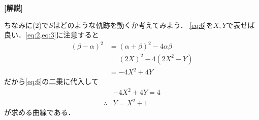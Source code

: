 \documentclass[../../main.tex]{subfiles}
\begin{document}
{\bf [解説]}

ちなみに(2)で$S$はどのような軌跡を動くか考えてみよう．
\cref{eq:6}を$X,Y$で表せば良い．\cref{eq:2,eq:3}に注意すると
\begin{align}
  (\beta-\alpha)^2
  &= (\alpha+\beta)^2 - 4\alpha\beta \\
  &= (2X)^2 - 4\left(2X^2 - Y\right) \\
  &= -4 X^2+4Y
\end{align}
だから\cref{eq:6}の二乗に代入して
\begin{align}
  &-4 X^2+4Y = 4 \\
  \therefore
  &Y = X^2+1
\end{align}
が求める曲線である．

\newpage
\end{document}
